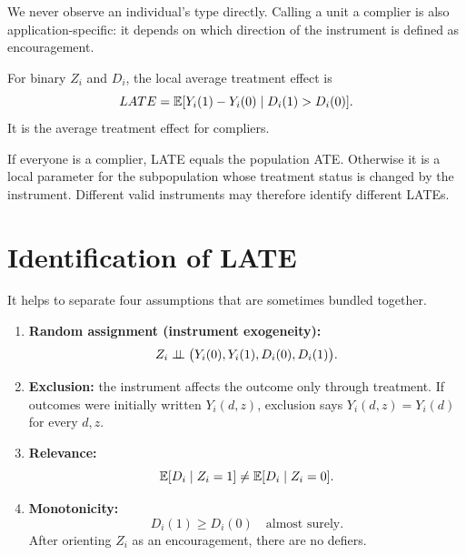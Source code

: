 We never observe an individual's type directly.  Calling a unit a complier is
also application-specific: it depends on which direction of the instrument is
defined as encouragement.

\begin{definition}
For binary $Z_i$ and $D_i$, the local average treatment effect is
\begin{equation}
  LATE=\mathbb{E}[Y_i(1)-Y_i(0)\mid D_i(1)>D_i(0)].
  \label{eq:late-definition}
\end{equation}
It is the average treatment effect for compliers.
\end{definition}

If everyone is a complier, LATE equals the population ATE.  Otherwise it is a
local parameter for the subpopulation whose treatment status is changed by the
instrument.  Different valid instruments may therefore identify different
LATEs.

\section{Identification of LATE}
\label{sec:late-identification}

It helps to separate four assumptions that are sometimes bundled together.

\begin{enumerate}
  \item \textbf{Random assignment (instrument exogeneity):}
  \begin{equation}
    Z_i\mathrel{\perp\!\!\!\perp}\bigl(Y_i(0),Y_i(1),D_i(0),D_i(1)\bigr).
    \label{eq:late-random-assignment}
  \end{equation}
  \item \textbf{Exclusion:} the instrument affects the outcome only through
  treatment.  If outcomes were initially written $Y_i(d,z)$, exclusion says
  $Y_i(d,z)=Y_i(d)$ for every $d,z$.
  \item \textbf{Relevance:}
  \begin{equation}
    \mathbb{E}[D_i\mid Z_i=1]\neq \mathbb{E}[D_i\mid Z_i=0].
    \label{eq:late-relevance}
  \end{equation}
  \item \textbf{Monotonicity:}
  \begin{equation}
    D_i(1)\geq D_i(0)\quad\text{almost surely}.
    \label{eq:late-monotonicity}
  \end{equation}
  After orienting $Z_i$ as an encouragement, there are no defiers.
\end{enumerate}

